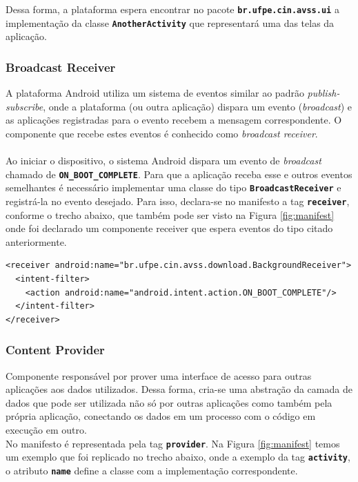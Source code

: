 \documentclass[a4paper,12pt]{article}
\begin{document}
Dessa forma, a plataforma espera encontrar no pacote {\small\texttt{\textbf{br.ufpe.cin.avss.ui}}} a implementação da classe {\small\textbf{\texttt{AnotherActivity}}} que representará uma das telas da aplicação.

\subsubsection{Broadcast Receiver}

A plataforma Android utiliza um sistema de eventos similar ao padrão \textit{publish-subscribe}, onde a plataforma (ou outra aplicação) dispara um evento (\textit{broadcast}) e as aplicações registradas para o evento recebem a mensagem correspondente. O componente que recebe estes eventos é conhecido como \textit{broadcast receiver}.\\
\\
\sloppy
Ao iniciar o dispositivo, o sistema Android dispara um evento de \textit{broadcast} chamado de {\small\texttt{\textbf{ON\_BOOT\_COMPLETE}}}. Para que a aplicação receba esse e outros eventos semelhantes é necessário implementar uma classe do tipo {\small\texttt{\textbf{BroadcastReceiver}}} e registrá-la no evento desejado. Para isso, declara-se no manifesto a tag {\small\texttt{\textbf{receiver}}}, conforme o trecho abaixo, que também pode ser visto na Figura \ref{fig:manifest} onde foi declarado um componente receiver que espera eventos do tipo citado anteriormente.
{\fontsize{9pt}{12pt}
\begin{verbatim}
<receiver android:name="br.ufpe.cin.avss.download.BackgroundReceiver">
  <intent-filter>
    <action android:name="android.intent.action.ON_BOOT_COMPLETE"/>
  </intent-filter>
</receiver>
\end{verbatim}
}

\subsubsection{Content Provider}
\label{sec:provider}
Componente responsável por prover uma interface de acesso para outras aplicações aos dados utilizados. Dessa forma, cria-se uma abstração da camada de dados que pode ser utilizada não só por outras aplicações como também pela própria aplicação, conectando os dados em um processo com o código em execução em outro.\\

No manifesto é representada pela tag {\small\texttt{\textbf{provider}}}. Na Figura \ref{fig:manifest} temos um exemplo que foi replicado no trecho abaixo, onde a exemplo da tag {\small\texttt{\textbf{activity}}}, o atributo {\small\texttt{\textbf{name}}} define a classe com a implementação correspondente.\\
\end{document}
